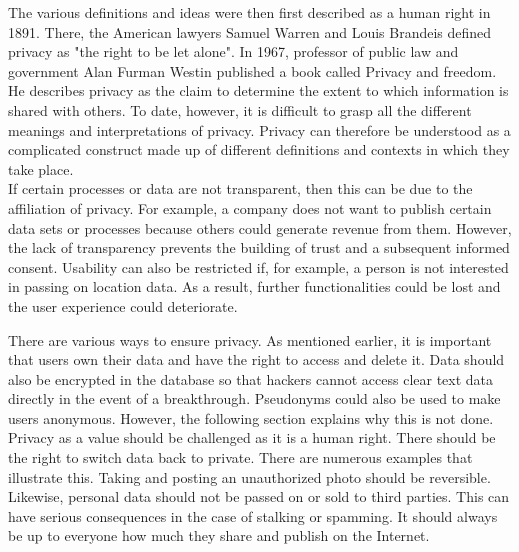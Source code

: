 The various definitions and ideas were then first described as a human right in 1891\cite{history-of-privacy}.
There, the American lawyers Samuel Warren and Louis Brandeis defined privacy as "the right to be let alone".
In 1967, professor of public law and government Alan Furman Westin published a book called Privacy and freedom\cite{privacy-and-freedom}.
He describes privacy as the claim to determine the extent to which information is shared with others.
To date, however, it is difficult to grasp all the different meanings and interpretations of privacy.
Privacy can therefore be understood as a complicated construct made up of different definitions and contexts in which they take place.\\

If certain processes or data are not transparent, then this can be due to the affiliation of privacy.
For example, a company does not want to publish certain data sets or processes because others could generate revenue from them.
However, the lack of transparency prevents the building of trust and a subsequent informed consent.
Usability can also be restricted if, for example, a person is not interested in passing on location data.
As a result, further functionalities could be lost and the user experience could deteriorate.

There are various ways to ensure privacy.
As mentioned earlier, it is important that users own their data and have the right to access and delete it.
Data should also be encrypted in the database so that hackers cannot access clear text data directly in the event of a breakthrough.
Pseudonyms could also be used to make users anonymous.
However, the following section explains why this is not done.\\

Privacy as a value should be challenged as it is a human right.
There should be the right to switch data back to private.
There are numerous examples that illustrate this.
Taking and posting an unauthorized photo should be reversible.
Likewise, personal data should not be passed on or sold to third parties.
This can have serious consequences in the case of stalking or spamming.
It should always be up to everyone how much they share and publish on the Internet.

